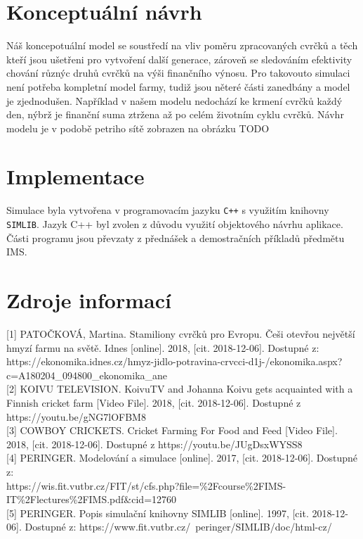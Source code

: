 \documentclass[a4paper, 12pt]{article}
\begin{document}
\section{Konceptuální návrh}
Náš koncepotuální model se soustředí na vliv poměru zpracovaných cvrčků a těch kteří jsou ušetřeni pro vytvoření další generace, zároveň se sledováním efektivity chování různýc druhů cvrčků na výši finančního výnosu. Pro takovouto simulaci není potřeba kompletní model farmy, tudiž jsou něteré části zanedbány a model je zjednodušen. Například v našem modelu nedochází ke krmení cvrčků každý den, nýbrž je finanční suma ztržena až po celém životním cyklu cvrčků. Návhr modelu je v podobě petriho sítě zobrazen na obrázku TODO

\section{Implementace}
Simulace byla vytvořena v programovacím jazyku \texttt{C++} s využitím knihovny \texttt{SIMLIB}. Jazyk C++ byl zvolen z důvodu využití objektového návrhu aplikace. Části programu jsou převzaty z přednášek a demostračních příkladů předmětu IMS. 

\section{Zdroje informací}
\setlength\parindent{0pt}
[1] PATOČKOVÁ, Martina. Stamiliony cvrčků pro Evropu. Češi otevřou největší hmyzí farmu na světě. Idnes [online]. 2018, [cit. 2018-12-06]. Dostupné z: https://ekonomika.idnes.cz/hmyz-jidlo-potravina-crvcci-d1j-/ekonomika.aspx?c=A180204\_094800\_ekonomika\_ane\\

[2] KOIVU TELEVISION. KoivuTV and Johanna Koivu gets acquainted with a Finnish cricket farm [Video File]. 2018, [cit. 2018-12-06]. Dostupné z https://youtu.be/gNG7lOFBM8\\

[3] COWBOY CRICKETS. Cricket Farming For Food and Feed [Video File]. 2018, [cit. 2018-12-06]. Dostupné z https://youtu.be/JUgDsxWYSS8\\

[4] PERINGER. Modelování a simulace [online]. 2017, [cit. 2018-12-06]. Dostupné z:\\ https://wis.fit.vutbr.cz/FIT/st/cfs.php?file=\%2Fcourse\%2FIMS-IT\%2Flectures\%2FIMS.pdf\&cid=12760 \\

[5] PERINGER. Popis simulační knihovny SIMLIB [online]. 1997, [cit. 2018-12-06]. Dostupné z: https://www.fit.vutbr.cz/~peringer/SIMLIB/doc/html-cz/
\end{document}
